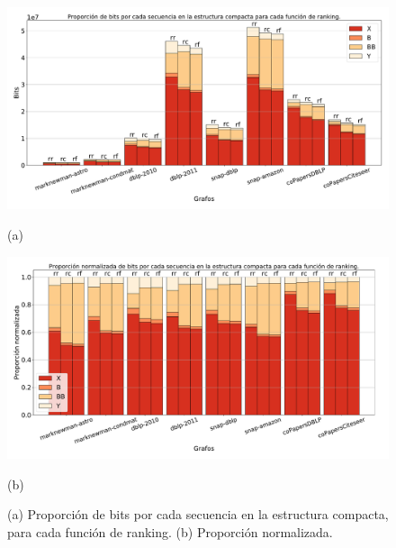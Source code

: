 \begin{figure}
    	\centering
    	\begin{minipage}{1\textwidth}
    		\centering
    		\includegraphics[width=1\linewidth]{img/bits.pdf}
    		
    		(a)
    	\end{minipage}  
    	\begin{minipage}{1\textwidth}
    		\centering
    		\includegraphics[width=1\linewidth]{img/bitsNorm.pdf}
    		
    		(b)
    	\end{minipage}  
    \caption{(a) Proporción de bits por cada secuencia en la estructura compacta, para cada función de ranking. (b) Proporción normalizada.}
    \label{fig:proportionBits}
\end{figure}
